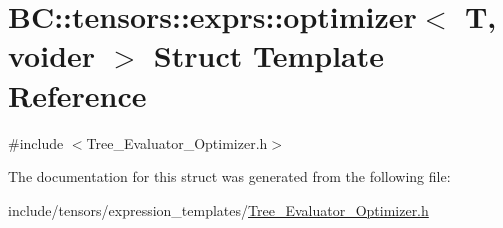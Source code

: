 \hypertarget{structBC_1_1tensors_1_1exprs_1_1optimizer}{}\section{BC\+:\+:tensors\+:\+:exprs\+:\+:optimizer$<$ T, voider $>$ Struct Template Reference}
\label{structBC_1_1tensors_1_1exprs_1_1optimizer}


{\ttfamily \#include $<$Tree\+\_\+\+Evaluator\+\_\+\+Optimizer.\+h$>$}



The documentation for this struct was generated from the following file\+:\begin{DoxyCompactItemize}
\item 
include/tensors/expression\+\_\+templates/\hyperlink{Tree__Evaluator__Optimizer_8h}{Tree\+\_\+\+Evaluator\+\_\+\+Optimizer.\+h}\end{DoxyCompactItemize}
